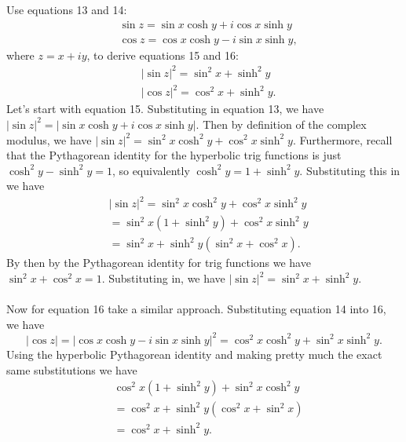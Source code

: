 \documentclass{article}
\theoremstyle{definition}
\newcommand{\cs}[1]{\color{blue}{#1}\normalcolor}
\begin{document}
 Use equations 13 and 14: 
$$\begin{array}{cc}
     & \sin z = \sin x\cosh y + i \cos x  \sinh y \\
     & \cos z = \cos x \cosh y - i \sin x \sinh y,
\end{array}$$
where $z = x + iy$, to derive equations 15 and 16:
$$\begin{array}{cc}
     &  |\sin z|^2 = \sin^2x+\sinh^2y\\
     & |\cos z|^2 = \cos^2x+\sinh^2y.
\end{array}$$
 Let's start with equation 15. Substituting in equation 13, we have 
$|\sin z|^2 = |\sin x \cosh y + i\cos x \sinh y|.$
 Then by definition of the complex modulus, we have $|\sin z|^2 = \sin^2 x\cosh^2 y + \cos^2 x\sinh^2 y$. Furthermore, recall that the Pythagorean identity for the hyperbolic trig functions is just $\cosh^2y - \sinh^2y = 1$, so equivalently $\cosh^2 y = 1 + \sinh^2 y$. Substituting this in we have 
 $$\begin{array}{cc}
      &  |\sin z|^2 =  \sin^2 x\cosh^2 y + \cos^2 x\sinh^2 y\\
      &  = \sin^2 x(1+\sinh^2 y) + \cos^2 x\sinh^2 y\\
      & = \sin^2 x + \sinh^2 y(\sin^2x + \cos^2x).
 \end{array}$$
 By then by the Pythagorean identity for trig functions we have $\sin^2 x + \cos^2 x = 1$. Substituting in, we have $|\sin z|^2 = \sin^2 x + \sinh^2 y$.\\
 \\

Now for equation 16 take a similar approach. Substituting equation 14 into 16, we have 
$$|\cos z| = |\cos x \cosh y - i \sin x \sinh y|^2 = \cos^2 x \cosh^2 y + \sin^2 x \sinh^2 y.$$ Using the hyperbolic Pythagorean identity and making pretty much the exact same substitutions we have 
$$
\begin{array}{cc}
     &  \cos^2x(1+\sinh^2 y) + \sin^2x\cosh^2 y\\
     & = \cos^2x +\sinh^2y(\cos^2x+\sin^2 x)\\
     & = \cos^2x + \sinh^2 y.
\end{array}
$$

\cs{5/5}
\end{document}
